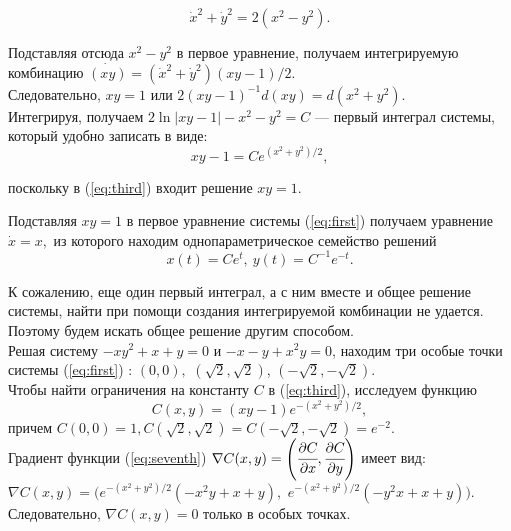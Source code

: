 \smallskip
\begin{equation}
    \dot x^2+\dot y^2=2(x^2-y^2).\label{eq:second}
\end{equation}

\smallskip
Подставляя отсюда $x^2-y^2$ в первое уравнение, получаем интегрируемую комбинацию $\dot{(xy)}=(\dot x^2+\dot y^2)(xy-1)/2.$\\

Следовательно, $xy=1$ или 
\smallskip
$2(xy-1)^{-1}d(xy)=d(x^2+y^2)$.\\

Интегрируя, получаем $ 2\ln|xy-1|-x^2-y^2=C$ --- первый интеграл системы, который удобно записать в виде:
\smallskip\noindent
\begin{equation}
    xy - 1 =C e^{(x^2+y^2)/2}, 
\label{eq:third}
\end{equation}

\noindent поскольку в (\ref{eq:third}) входит решение $xy = 1$.

Подставляя $xy=1$ в первое уравнение системы (\ref{eq:first}) получаем уравнение $\dot x=x,$ из которого находим однопараметрическое семейство решений $$x(t)=Ce^{t},\ y(t)=C^{-1}e^{-t}.$$

К сожалению, еще один первый интеграл, а с ним вместе и общее решение системы, найти при помощи создания интегрируемой комбинации не удается. Поэтому будем искать общее решение другим способом.\\

Решая систему $-xy^2+x+y = 0$ и $-x-y+x^2y = 0$,
 находим три особые точки системы (\ref{eq:first}) : $(0,0),$ $ (\sqrt{2}, \sqrt{2})$, $ (-\sqrt{2}, -\sqrt{2})$. \\

Чтобы найти ограничения на константу $C$ в (\ref{eq:third}), исследуем функцию 
\begin{equation}
            C(x,y) = (xy-1)e^{-(x^2+y^2)/2},
    \label{eq:seventh}
\end{equation}
\noindent причем $C(0,0) = 1, C(\sqrt{2},\sqrt{2}) = C(-\sqrt{2}, -\sqrt{2}) = e^{-2}.$\\

Градиент функции (\ref{eq:seventh}) $\nabla C(x,y) = \left (\cfrac{\partial C}{\partial x}, \cfrac{\partial C}{\partial y} \right)$ имеет вид:\\$ \nabla C(x,y) = (e^{-(x^2+y^2)/2}(-x^2y + x + y),$ $ e^{-(x^2+y^2)/2}(-y^2x + x + y))$.\\

Следовательно, $\nabla C(x,y)=0$ только в особых точках.\\

